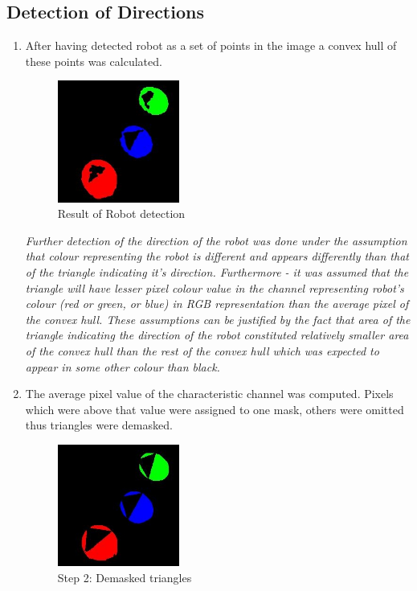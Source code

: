 \documentclass[10pt,a4paper,twocolumn]{article}
\begin{document}
\subsection{Detection of Directions}
\begin{enumerate}
    \item
    After having detected robot as a set of points in the image a convex hull 
    of these points was calculated.
    \begin{figure}[h]
        \centering
        \includegraphics[width=40mm]{d1_i5_blob_mask.jpg}
        \caption{Result of Robot detection}
    \end{figure} 
    \textit{
    Further detection of the direction of the robot was done under the 
    assumption that colour representing the robot is different and appears 
    differently than that of the triangle indicating it's direction. 
    Furthermore - it was assumed that the triangle will have lesser pixel 
    colour value in the channel representing robot's colour (red or green, or 
    blue) in RGB representation than the average pixel of the convex hull. 
    These assumptions can be justified by the fact that area of the triangle 
    indicating the direction of the robot constituted relatively smaller area 
    of the convex hull than the rest of the convex hull which was expected to 
    appear in some other colour than black.
    } 

    \item
    The average pixel value of the characteristic channel was computed. Pixels 
    which were above that value were assigned to one mask, others were omitted 
    thus triangles were demasked.
    \begin{figure}[h]
        \centering
        \includegraphics[width=40mm]{d1_i5_demasked_triangles.jpg}
        \caption{Step 2: Demasked triangles}
    \end{figure} 


\end{enumerate}
\end{document}
